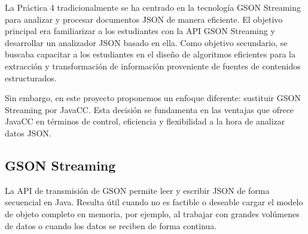 \noindent La Práctica 4 tradicionalmente se ha centrado en la tecnología GSON Streaming para analizar y procesar documentos JSON de manera eficiente. El objetivo principal era familiarizar a los estudiantes con la API GSON Streaming y desarrollar un analizador JSON basado en ella. Como objetivo secundario, se buscaba capacitar a los estudiantes en el diseño de algoritmos eficientes para la extracción y transformación de información proveniente de fuentes de contenidos estructurados.

Sin embargo, en este proyecto proponemos un enfoque diferente: sustituir GSON Streaming por JavaCC. Esta decisión se fundamenta en las ventajas que ofrece JavaCC en términos de control, eficiencia y flexibilidad a la hora de analizar datos JSON.

\subsection{GSON Streaming}





\noindent La API de transmisión de GSON permite leer y escribir JSON de forma secuencial en Java. Resulta útil cuando no es factible o deseable cargar el modelo de objeto completo en memoria, por ejemplo, al trabajar con grandes volúmenes de datos o cuando los datos se reciben de forma continua.

